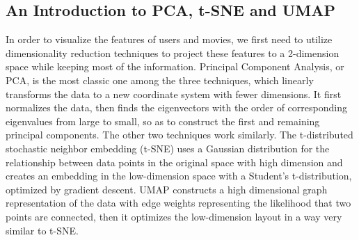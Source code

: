 \documentclass{article}
\begin{document}
\subsection{An Introduction to PCA, t-SNE and UMAP}
In order to visualize the features of users and movies, we first need to utilize dimensionality reduction techniques to project these features to a 2-dimension space while keeping most of the information. Principal Component Analysis, or PCA, is the most classic one among the three techniques, which linearly transforms the data to a new coordinate system with fewer dimensions. It first normalizes the data, then finds the eigenvectors with the order of corresponding eigenvalues from large to small, so as to construct the first and remaining principal components. The other two techniques work similarly. The t-distributed stochastic neighbor embedding (t-SNE) uses a Gaussian distribution for the relationship between data points in the original space with high dimension and creates an embedding in the low-dimension space with a Student's t-distribution, optimized by gradient descent. UMAP constructs a high dimensional graph representation of the data with edge weights representing the likelihood that two points are connected, then it optimizes the low-dimension layout in a way very similar to t-SNE. 
\end{document}
